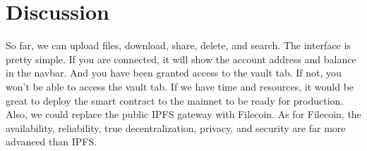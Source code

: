 \newpage
\section{Discussion}


So far, we can upload files, download, share, delete, and search. The interface is pretty simple. If you are connected, it will show the account address and balance in the navbar. And you have been granted access to the vault tab. If not, you won't be able to access the vault tab.
If we have time and resources, it would be great to deploy the smart contract to the mainnet to be ready for production.
Also, we could replace the public IPFS gateway with Filecoin. As for Filecoin, the availability, reliability, true decentralization,  privacy, and security are far more advanced than IPFS.

